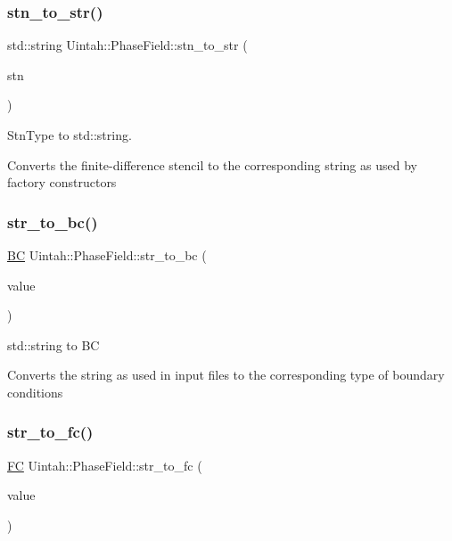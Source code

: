 \subsubsection{\texorpdfstring{stn\+\_\+to\+\_\+str()}{stn\_to\_str()}}
{\footnotesize\ttfamily std\+::string Uintah\+::\+Phase\+Field\+::stn\+\_\+to\+\_\+str (\begin{DoxyParamCaption}\item[{\hyperlink{namespaceUintah_1_1PhaseField_a24d833a720598df1020f5cc2e75f8702}{Stn\+Type}}]{stn }\end{DoxyParamCaption})\hspace{0.3cm}{\ttfamily [inline]}}



Stn\+Type to std\+::string. 

Converts the finite-\/difference stencil to the corresponding string as used by factory constructors \mbox{\label{namespaceUintah_1_1PhaseField_ae111bd8827ecc139cc3c88e52ceb141d}} 
\subsubsection{\texorpdfstring{str\+\_\+to\+\_\+bc()}{str\_to\_bc()}}
{\footnotesize\ttfamily \hyperlink{namespaceUintah_1_1PhaseField_a148fba372aa3be96fd6eede7a2fa10b5}{BC} Uintah\+::\+Phase\+Field\+::str\+\_\+to\+\_\+bc (\begin{DoxyParamCaption}\item[{const std\+::string \&}]{value }\end{DoxyParamCaption})\hspace{0.3cm}{\ttfamily [inline]}}



std\+::string to BC 

Converts the string as used in input files to the corresponding type of boundary conditions \mbox{\label{namespaceUintah_1_1PhaseField_a1b73af9bf55d015e399d292360fd700b}} 
\subsubsection{\texorpdfstring{str\+\_\+to\+\_\+fc()}{str\_to\_fc()}}
{\footnotesize\ttfamily \hyperlink{namespaceUintah_1_1PhaseField_aeb51fe956fe07f1487f5878f4039f27c}{FC} Uintah\+::\+Phase\+Field\+::str\+\_\+to\+\_\+fc (\begin{DoxyParamCaption}\item[{const std\+::string \&}]{value }\end{DoxyParamCaption})\hspace{0.3cm}{\ttfamily [inline]}}



